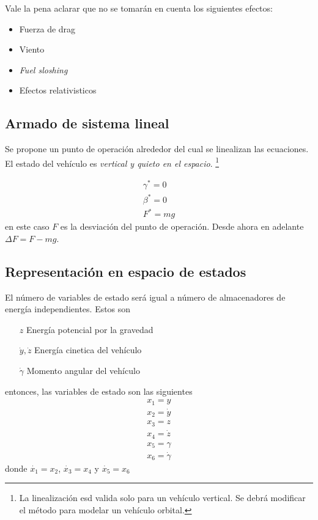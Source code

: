 Vale la pena aclarar que no se tomarán en cuenta los siguientes efectos:
\begin{itemize}
	\item Fuerza de drag
	\item Viento
	\item \textit{Fuel sloshing}
	\item Efectos relativisticos
\end{itemize}

\subsection{Armado de sistema lineal}

Se propone un punto de operación alrededor del cual se linealizan las ecuaciones. El estado del vehículo es \textit{vertical y quieto en el espacio}. \footnote{La linealización esd valida solo para un vehículo vertical. Se debrá modificar el método para modelar un vehículo orbital.} 

\begin{align*}
	\gamma^* = 0 \\
	\beta^* = 0 \\
	F^* = mg
\end{align*}
en este caso $F$ es la desviación del punto de operación. Desde ahora en adelante $\Delta F = F- mg$.

\subsection{Representación en espacio de estados}
El número de variables de estado será igual a número de almacenadores de energía independientes. Estos son

\begin{enumerate}
	\item[$z$] Energía potencial por la gravedad
	\item[$\dot{y},\dot{z}$] Energía cinetica del vehículo
	\item[$\dot{\gamma}$] Momento angular del vehículo
\end{enumerate}
entonces, las variables de estado son las siguientes
\begin{align*}
	x_1 = y \\
	x_2 = \dot{y} \\
	x_3 = z \\
	x_4 = \dot{z} \\
	x_5 = \gamma \\
	x_6 = \dot{\gamma}
\end{align*}
donde $\dot{x_1} = x_2$, $\dot{x_3} = x_4$ y $\dot{x_5} = x_6$

